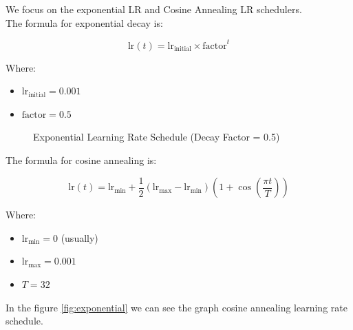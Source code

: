 We focus on the exponential LR and Cosine Annealing LR schedulers.\\

The formula for exponential decay is:

\begin{equation}
\text{lr}(t) = \text{lr}_\text{initial} \times \text{factor}^t
\end{equation}

Where:
\begin{itemize}
    \item $\text{lr}_\text{initial} = 0.001$
    \item $\text{factor} = 0.5$
\end{itemize}

\begin{figure}[h]
    \centering
    \caption{Exponential Learning Rate Schedule (Decay Factor = 0.5)}
\end{figure}

The formula for cosine annealing is:

\begin{equation}
\text{lr}(t) = \text{lr}_\text{min} + \frac{1}{2}(\text{lr}_\text{max} - \text{lr}_\text{min})(1 + \cos(\frac{\pi t}{T}))
\end{equation}

Where:
\begin{itemize}
    \item $\text{lr}_\text{min} = 0$ (usually)
    \item $\text{lr}_\text{max} = 0.001$
    \item $T = 32$
\end{itemize}

In the figure \ref{fig:exponential} we can see the graph cosine annealing learning rate schedule.

